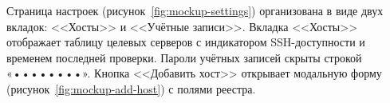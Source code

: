 




Страница настроек (рисунок~\ref{fig:mockup-settings}) организована в виде двух вкладок: <<Хосты>> и <<Учётные записи>>. Вкладка <<Хосты>> отображает таблицу целевых серверов с индикатором SSH-доступности и временем последней проверки. Пароли учётных записей скрыты строкой «••••••••». Кнопка <<Добавить хост>> открывает модальную форму (рисунок~\ref{fig:mockup-add-host}) с полями реестра.





